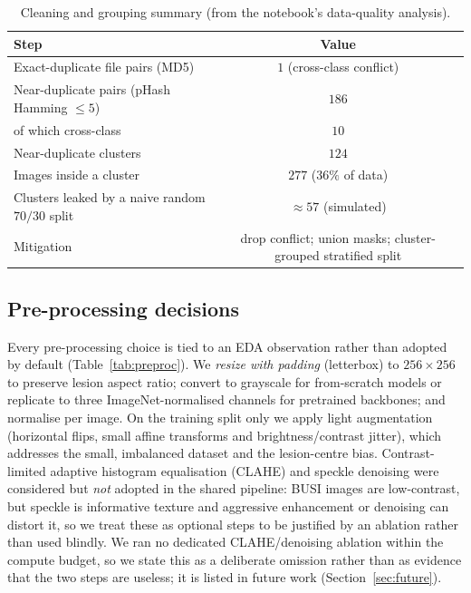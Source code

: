 \documentclass[11pt]{article}
\begin{document}
\begin{table}[t]
\centering
\caption{Cleaning and grouping summary (from the notebook's data-quality
analysis).}
\label{tab:cleaning}
\small
\begin{tabular}{@{}lc@{}}
\toprule
Step & Value \\
\midrule
Exact-duplicate file pairs (MD5)                 & $1$ (cross-class conflict) \\
Near-duplicate pairs (pHash Hamming $\leq 5$)    & $186$ \\
\quad of which cross-class                       & $10$ \\
Near-duplicate clusters                          & $124$ \\
Images inside a cluster                          & $277$ ($36\%$ of data) \\
Clusters leaked by a naive random $70/30$ split  & $\approx 57$ (simulated) \\
Mitigation                                       & drop conflict; union masks; cluster-grouped stratified split \\
\bottomrule
\end{tabular}
\end{table}

\subsection{Pre-processing decisions}
\label{sec:eda-pre}
Every pre-processing choice is tied to an EDA observation rather than adopted by
default (Table~\ref{tab:preproc}). We \emph{resize with padding} (letterbox) to
$256\times256$ to preserve lesion aspect ratio; convert to grayscale for
from-scratch models or replicate to three ImageNet-normalised channels for
pretrained backbones; and normalise per image. On the training split only we
apply light augmentation (horizontal flips, small affine transforms and
brightness/contrast jitter), which addresses the small, imbalanced dataset and the
lesion-centre bias. Contrast-limited adaptive histogram equalisation (CLAHE) and
speckle denoising were considered but \emph{not} adopted in the shared pipeline:
BUSI images are low-contrast, but speckle is informative texture and aggressive
enhancement or denoising can distort it, so we treat these as optional steps to be
justified by an ablation rather than used blindly. We ran no dedicated
CLAHE/denoising ablation within the compute budget, so we state this as a
deliberate omission rather than as evidence that the two steps are useless; it is
listed in future work (Section~\ref{sec:future}).
\end{document}
